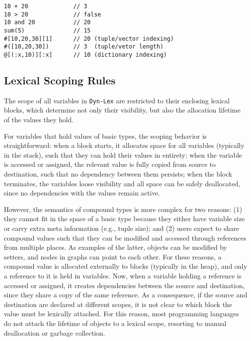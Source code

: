 \documentclass[12pt]{article}
\newcommand{\lex} {\texttt{Dyn-Lex}\xspace}
\begin{document}
{\footnotesize
\begin{verbatim}
10 + 20             // 3
10 > 20             // false
10 and 20           // 20
sum(5)              // 15
#[10,20,30][1]      // 20 (tuple/vector indexing)
#([10,20,30])       // 3  (tuple/vetor length)
@[(:x,10)][:x]      // 10 (dictionary indexing)
\end{verbatim}
}

\subsection{Lexical Scoping Rules}

The scope of all variables in \lex are restricted to their enclosing lexical
blocks, which determine not only their visibility, but also the allocation
lifetime of the values they hold.

For variables that hold values of basic types, the scoping behavior is
straightforward:
    when a block starts, it allocates space for all variables (typically in the
        stack), such that they can hold their values in entirety;
    when the variable is accessed or assigned, the relevant value is fully
        copied from source to destination, such that no dependency between them
        persists;
    when the block terminates, the variables loose visibility and all space can
        be safely deallocated, since no dependencies with the values remain
        active.

However, the semantics of compound types is more complex for two reasons:
    (1) they cannot fit in the space of a basic type because they either have
        variable size or carry extra meta information (e.g., tuple size); and
    (2) users expect to share compound values such that they can be modified
        and accessed through references from multiple places.
As examples of the latter, objects can be modified by setters, and nodes in
graphs can point to each other.
%
For these reasons, a compound value is allocated externally to blocks
(typically in the heap), and only a reference to it is held in variables.
Now, when a variable holding a reference is accessed or assigned, it creates
dependencies between the source and destination, since they share a copy of the
same reference.
%
As a consequence, if the source and destination are declared at different
scopes, it is not clear to which block the value must be lexically attached.
For this reason, most programming languages do not attach the lifetime of
objects to a lexical scope, resorting to manual deallocation or garbage
collection.
\end{document}

